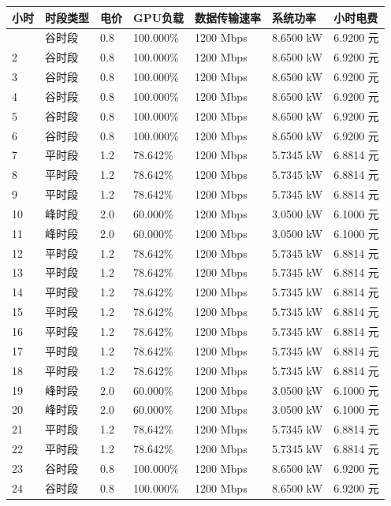 \documentclass[
]{article}
\begin{document}
\begin{longtable}[]{@{}lllllll@{}}
\toprule\noalign{}
小时 & 时段类型 & 电价 & GPU负载 & 数据传输速率 & 系统功率 & 小时电费 \\
\midrule\noalign{}
\endhead
\bottomrule\noalign{}
\endlastfoot
1 & 谷时段 & 0.8 & 100.000\% & 1200 Mbps & 8.6500 kW & 6.9200 元 \\
2 & 谷时段 & 0.8 & 100.000\% & 1200 Mbps & 8.6500 kW & 6.9200 元 \\
3 & 谷时段 & 0.8 & 100.000\% & 1200 Mbps & 8.6500 kW & 6.9200 元 \\
4 & 谷时段 & 0.8 & 100.000\% & 1200 Mbps & 8.6500 kW & 6.9200 元 \\
5 & 谷时段 & 0.8 & 100.000\% & 1200 Mbps & 8.6500 kW & 6.9200 元 \\
6 & 谷时段 & 0.8 & 100.000\% & 1200 Mbps & 8.6500 kW & 6.9200 元 \\
7 & 平时段 & 1.2 & 78.642\% & 1200 Mbps & 5.7345 kW & 6.8814 元 \\
8 & 平时段 & 1.2 & 78.642\% & 1200 Mbps & 5.7345 kW & 6.8814 元 \\
9 & 平时段 & 1.2 & 78.642\% & 1200 Mbps & 5.7345 kW & 6.8814 元 \\
10 & 峰时段 & 2.0 & 60.000\% & 1200 Mbps & 3.0500 kW & 6.1000 元 \\
11 & 峰时段 & 2.0 & 60.000\% & 1200 Mbps & 3.0500 kW & 6.1000 元 \\
12 & 平时段 & 1.2 & 78.642\% & 1200 Mbps & 5.7345 kW & 6.8814 元 \\
13 & 平时段 & 1.2 & 78.642\% & 1200 Mbps & 5.7345 kW & 6.8814 元 \\
14 & 平时段 & 1.2 & 78.642\% & 1200 Mbps & 5.7345 kW & 6.8814 元 \\
15 & 平时段 & 1.2 & 78.642\% & 1200 Mbps & 5.7345 kW & 6.8814 元 \\
16 & 平时段 & 1.2 & 78.642\% & 1200 Mbps & 5.7345 kW & 6.8814 元 \\
17 & 平时段 & 1.2 & 78.642\% & 1200 Mbps & 5.7345 kW & 6.8814 元 \\
18 & 平时段 & 1.2 & 78.642\% & 1200 Mbps & 5.7345 kW & 6.8814 元 \\
19 & 峰时段 & 2.0 & 60.000\% & 1200 Mbps & 3.0500 kW & 6.1000 元 \\
20 & 峰时段 & 2.0 & 60.000\% & 1200 Mbps & 3.0500 kW & 6.1000 元 \\
21 & 平时段 & 1.2 & 78.642\% & 1200 Mbps & 5.7345 kW & 6.8814 元 \\
22 & 平时段 & 1.2 & 78.642\% & 1200 Mbps & 5.7345 kW & 6.8814 元 \\
23 & 谷时段 & 0.8 & 100.000\% & 1200 Mbps & 8.6500 kW & 6.9200 元 \\
24 & 谷时段 & 0.8 & 100.000\% & 1200 Mbps & 8.6500 kW & 6.9200 元 \\
\end{longtable}
\end{document}
